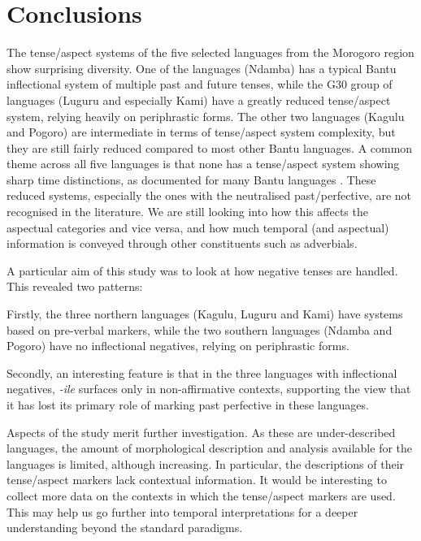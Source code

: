 \documentclass[output=paper,
            colorlinks, citecolor=brown
            ,draftmode
		  ]{langscibook}
\begin{document}
\section{Conclusions}\label{sec:petzell:5}

The tense/aspect systems of the five selected languages from the Morogoro region show surprising diversity. One of the languages (Ndamba) has a typical Bantu inflectional system of multiple past and future tenses, while the G30 group of languages (Luguru and especially Kami) have a greatly reduced tense/aspect system, relying heavily on periphrastic forms. The other two languages (Kagulu and Pogoro) are intermediate in terms of tense/aspect system complexity, but they are still fairly reduced compared to most other Bantu languages. A common theme across all five languages is that none has a tense/aspect system showing sharp time distinctions, as documented for many Bantu languages \citep[88--94]{Nurse2008}. These reduced systems, especially the ones with the neutralised past/perfective, are not recognised in the literature. We are still looking into how this affects the aspectual categories and vice versa, and how much temporal (and aspectual) information is conveyed through other constituents such as adverbials.



A particular aim of this study was to look at how negative tenses are handled. This revealed two patterns:



Firstly, the three northern languages (Kagulu, Luguru and Kami) have systems based on pre-verbal markers, while the two southern languages (Ndamba and Pogoro) have no inflectional negatives, relying on periphrastic forms.


\newpage
Secondly, an interesting feature is that in the three languages with inflectional negatives, \textit{{}-ile} surfaces only in non-affirmative contexts, supporting the view that it has lost its primary role of marking past perfective in these languages.



Aspects of the study merit further investigation. As these are under-described languages, the amount of morphological description and analysis available for the languages is limited, although increasing. In particular, the descriptions of their tense/aspect markers lack contextual information. It would be interesting to collect more data on the contexts in which the tense/aspect markers are used. This may help us go further into temporal interpretations for a deeper understanding beyond the standard paradigms.
\end{document}
